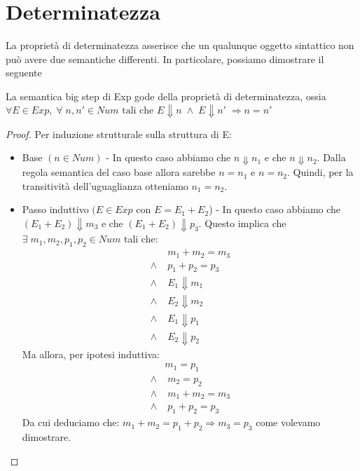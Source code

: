 \section{Determinatezza}
La proprietà di determinatezza asserisce che un qualunque oggetto sintattico non può
avere due semantiche differenti. In particolare, possiamo dimostrare il seguente

\begin{teorema}[Determinatezza]
La semantica big step di Exp gode della proprietà di determinatezza, ossia
$\forall E \in Exp, \; \forall \; n, n' \in Num \text{ tali che }
 E\Downarrow n \; \land \; E \Downarrow n' \; \Rightarrow n = n'$
\end{teorema}

\begin{proof}
Per induzione strutturale sulla struttura di E:
\begin{itemize}
	\item Base $(n \in Num)$ - 
		  In questo caso abbiamo che $n \Downarrow n_1$ e che $n \Downarrow n_2$.
		  Dalla regola semantica del caso base allora sarebbe $n=n_1$ e $n=n_2$.
		  Quindi, per la transitività dell'uguaglianza otteniamo $n_1 = n_2$.
	\item Passo induttivo $(E \in Exp$ con $E=E_1 + E_2$) - 
		  In questo caso abbiamo che $(E_1 + E_2) \Downarrow m_3$ e che $(E_1+E_2) \Downarrow p_3$.
		  Questo implica che $ \exists \; m_1,m_2,p_1,p_2 \in Num$ tali che:
		  \begin{align*}
		   & m_1 + m_2 = m_3 \\
		     \land \; & p_1+p_2 = p_3 \\
		     \land \; & E_1 \Downarrow m_1 \\
		     \land \; & E_2 \Downarrow m_2 \\ 
		     \land \; & E_1 \Downarrow p_1 \\ 
		     \land \; & E_2 \Downarrow p_2
		    \end{align*}
		  Ma allora, per ipotesi induttiva:
		  \begin{align*}
		  & m_1 = p_1 \\
		    \land & \; m_2 = p_2 \\
		    \land & \; m_1+m_2=m_3 \\
		    \land & \; p_1 + p_2 = p_3
		  \end{align*}
		  Da cui deduciamo che:
		  $ m_1 + m_2 = p_1 + p_2 \Rightarrow m_3 = p_3$ come volevamo dimostrare.
\end{itemize}
\end{proof}

